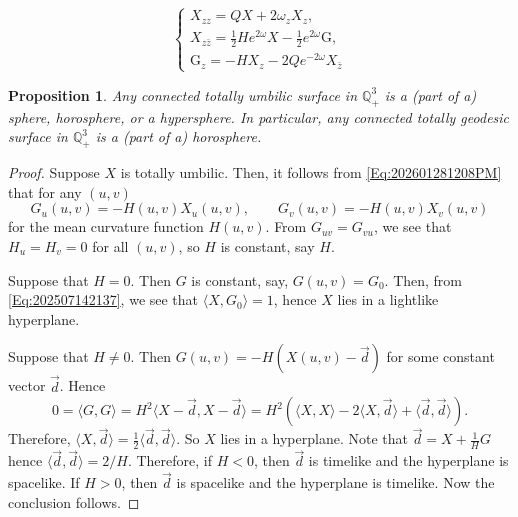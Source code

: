 \documentclass[10pt,a4paper]{amsart}
\newtheorem{proposition}{Proposition}
\newcommand{\G}{\mathrm{G}}
\newcommand{\h}{H}%
\newcommand{\qthreep}{\mathbb{Q}^3_+}
\begin{document}
\begin{equation}\label{Eq:202601281208PM}
	\begin{cases}
		X_{zz} = Q X + 2 \omega_z X_z,                                      \\
		X_{z\bar{z}} = \frac{1}{2}He^{2\omega}X - \frac{1}{2}e^{2\omega}\G, \\
		\G_z = -HX_z - 2Qe^{-2 \omega}X_{\bar{z}}
	\end{cases}
\end{equation}

\begin{proposition}\label{Prop:202601150810PM}
	Any connected totally umbilic surface in $\qthreep$ is a (part of a) sphere, horosphere, or a hypersphere.
	In particular, any connected totally geodesic surface in $\qthreep$ is a (part of a) horosphere.
\end{proposition}\label{Prop:202601150642AM}

\begin{proof}
	Suppose $X$ is totally umbilic. Then, it follows from \eqref{Eq:202601281208PM} that for any $(u,v)$
	$$
		G_u(u,v) = -H(u,v) X_u(u,v), \qquad
		G_v(u,v) = -H(u,v) X_v(u,v)
	$$
	for the mean curvature function $H(u,v) $.
	From $G_{uv} = G_{vu}$, we see that $H_u=H_v=0$ for all $(u,v)$, so $H$ is constant, say $\h$.

	Suppose that $\h = 0$. Then $G$ is constant, say, $G(u,v)=G_0$. Then, from \eqref{Eq:202507142137}, we see that $\langle X, G_0 \rangle = 1$,
	hence $X$ lies in a lightlike hyperplane.

	Suppose that $\h \not= 0$. Then
	$
		G(u,v) = -\h ( X(u,v) - \vec{d} )
	$
	for some constant vector $\vec{d}$.
	Hence
	$$
		0 = \langle G, G \rangle = \h^2 \langle X-\vec{d}, X-\vec{d} \rangle = \h^2 ( \langle X, X \rangle - 2 \langle X, \vec{d} \rangle + \langle \vec{d},\vec{d} \rangle).
	$$
	Therefore,
	$
		\langle X, \vec{d} \rangle = \tfrac{1}{2} \langle \vec{d}, \vec{d} \rangle.
	$
	So $X$ lies in a hyperplane.
	Note that $\vec{d} = X + \tfrac{1}{\h} G$ hence
	$
		\langle \vec{d}, \vec{d} \rangle = 2/\h.
	$
	Therefore, if $\h<0$, then $\vec{d}$ is timelike and the hyperplane is spacelike.
	If $\h>0$, then $\vec{d}$ is spacelike and the hyperplane is timelike. Now the conclusion follows.
\end{proof}
\end{document}
